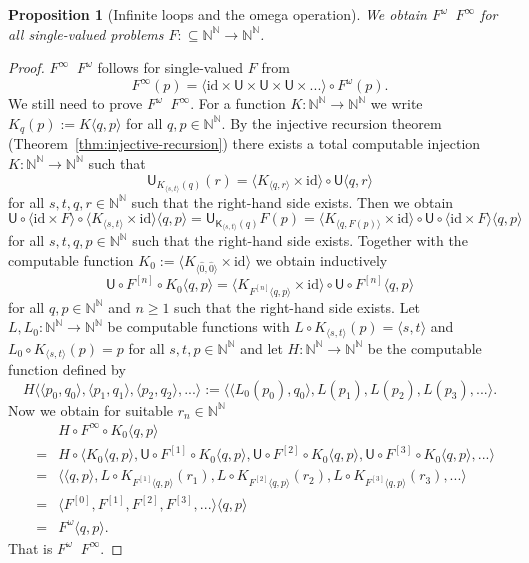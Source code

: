 \documentclass[11pt,a4paper]{amsart}
\theoremstyle{plain}
\newtheorem{prop}[thm]{Proposition}
\theoremstyle{definition}
\theoremstyle{defC}
\theoremstyle{thmC}
\theoremstyle{plain}
\numberwithin{equation}{section}
\def\IN{{\mathbb{N}}}
\def\In{\subseteq}
\def\K{{\mathsf{{K}}}}
\def\U{{\mathsf{{U}}}}
\def\leqSW{\mathop{\leq_{\mathrm{sW}}}}
\def\equivSW{\mathop{\equiv_{\mathrm{sW}}}}
\def\leqSW{\mathop{\leq_{\mathrm{sW}}}}
\def\equivSW{\mathop{\equiv_{\mathrm{sW}}}}
\def\id{{\mathrm{id}}}
\begin{document}
\begin{prop}[Infinite loops and the omega operation]
\label{prop:inverse-omega}
We obtain $F^\omega\equivSW F^\infty$ for all single-valued problems $F:\In\IN^\IN\to\IN^\IN$.
\end{prop}
\begin{proof}
$F^\infty\leqSW F^\omega$ follows for single-valued $F$ from
\[F^\infty(p)=\langle\id\times\U\times\U\times\U\times...\rangle\circ F^\omega(p).\]
We still need to prove $F^\omega\leqSW F^\infty$. 
For a function $K:\IN^\IN\to\IN^\IN$ we write $K_q(p):=K\langle q,p\rangle$ for all $q,p\in\IN^\IN$.
By the injective recursion theorem (Theorem~\ref{thm:injective-recursion}) there exists a total computable injection
$K:\IN^\IN\to\IN^\IN$ such that
\[\U_{K_{\langle s,t\rangle}(q)}(r)=\langle K_{\langle q,r\rangle}\times\id\rangle\circ\U\langle q,r\rangle\]
for all $s,t,q,r\in\IN^\IN$ such that the right-hand side exists.
Then we obtain
\[\U\circ\langle\id\times F\rangle\circ \langle K_{\langle s,t\rangle}\times\id\rangle\langle q,p\rangle
=\U_{\K_{\langle s,t\rangle}(q)}F(p)=\langle K_{\langle q,F(p)\rangle}\times\id\rangle\circ\U\circ\langle \id\times F\rangle\langle q,p\rangle\]
for all $s,t,q,p\in\IN^\IN$ such that the right-hand side exists. 
Together with the computable function $K_0:=\langle K_{\langle\widehat{0},\widehat{0}\rangle}\times\id\rangle$
we obtain inductively
\[\U\circ F^{[n]}\circ K_0\langle q,p\rangle=\langle K_{F^{[n]}\langle q,p\rangle}\times\id\rangle\circ\U\circ F^{[n]}\langle q,p\rangle\]
for all $q,p\in\IN^\IN$ and $n\geq1$ such that the right-hand side exists.
Let $L,L_0:\IN^\IN\to\IN^\IN$ be computable functions with $L\circ K_{\langle s,t\rangle}(p)=\langle s,t\rangle$ 
and $L_0\circ K_{\langle s,t\rangle}(p)=p$ for all
$s,t,p\in\IN^\IN$ and let $H:\IN^\IN\to\IN^\IN$ be the computable function defined by
\[H\langle\langle p_0,q_0\rangle,\langle p_1,q_1\rangle,\langle p_2,q_2\rangle,...\rangle:=\langle \langle L_0(p_0),q_0\rangle,L(p_1),L(p_2),L(p_3),...\rangle.\]
Now we obtain for suitable $r_n\in\IN^\IN$
\begin{eqnarray*}
&&H\circ F^\infty\circ K_0\langle q,p\rangle\\
&=& H\circ\langle K_0\langle q,p\rangle,\U\circ F^{[1]}\circ K_0\langle q,p\rangle,\U\circ F^{[2]}\circ K_0\langle q,p\rangle,\U\circ F^{[3]}\circ K_0\langle q,p\rangle,...\rangle\\
 &=& \langle \langle q,p\rangle,L\circ K_{F^{[1]}\langle q,p\rangle}(r_1),L\circ K_{F^{[2]}\langle q,p\rangle}(r_2),L\circ K_{F^{[3]}\langle q,p\rangle}(r_3),...\rangle\\
 &=& \langle F^{[0]},F^{[1]},F^{[2]},F^{[3]},...\rangle\langle q,p\rangle\\
 &=& F^\omega\langle q,p\rangle.
\end{eqnarray*}
That is $F^\omega\leqSW F^\infty$.
\end{proof}
\end{document}
